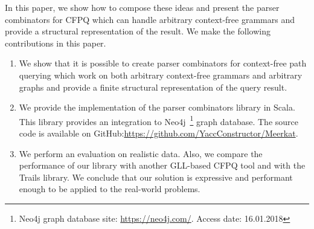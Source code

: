 In this paper, we show how to compose these ideas and present the parser combinators for CFPQ which can handle arbitrary context-free grammars and provide a structural representation of the result.
We make the following contributions in this paper.

\begin{enumerate}
\item We show that it is possible to create parser combinators for context-free path querying which work on both arbitrary context-free grammars and arbitrary graphs and provide a finite structural representation of the query result.
\item We provide the implementation of the parser combinators library in Scala. This library provides an integration to Neo4j~\footnote{Neo4j graph database site: \url{https://neo4j.com/}. Access date: 16.01.2018} graph database. The source code is available on GitHub:\url{https://github.com/YaccConstructor/Meerkat}.
\item We perform an evaluation on realistic data. 
Also, we compare the performance of our library with another GLL-based CFPQ tool and with the Trails library.
We conclude that our solution is expressive and performant enough to be applied to the real-world problems. 
\end{enumerate}